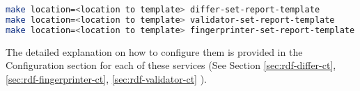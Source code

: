 \begin{lstlisting}[language=bash,]
make location=<location to template> differ-set-report-template
make location=<location to template> validator-set-report-template
make location=<location to template> fingerprinter-set-report-template
\end{lstlisting}	 	 

	The detailed explanation on how to configure them is provided in the Configuration section for each of these services (See Section \ref{sec:rdf-differ-ct}, \ref{sec:rdf-fingerprinter-ct}, \ref{sec:rdf-validator-ct} ). 
 
